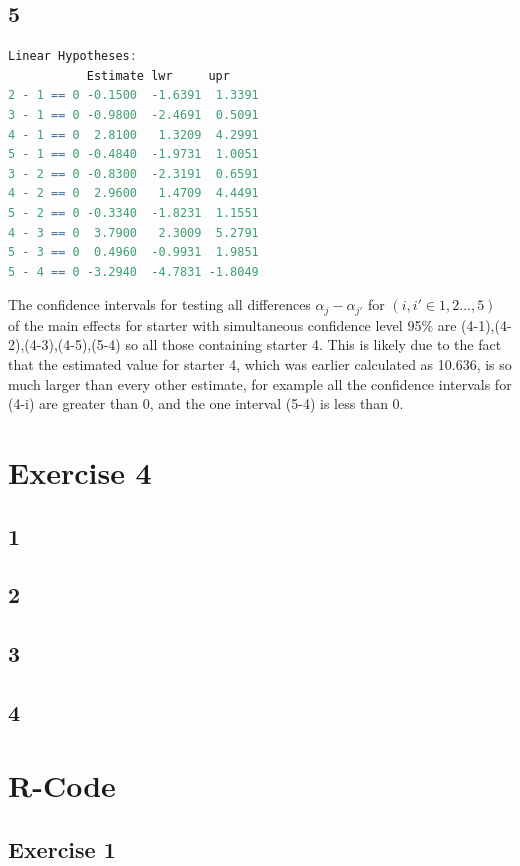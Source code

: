 \documentclass{article}
\begin{document}
    \subsection*{5}
      \begin{lstlisting}[language=R]
Linear Hypotheses:
           Estimate lwr     upr    
2 - 1 == 0 -0.1500  -1.6391  1.3391
3 - 1 == 0 -0.9800  -2.4691  0.5091
4 - 1 == 0  2.8100   1.3209  4.2991
5 - 1 == 0 -0.4840  -1.9731  1.0051
3 - 2 == 0 -0.8300  -2.3191  0.6591
4 - 2 == 0  2.9600   1.4709  4.4491
5 - 2 == 0 -0.3340  -1.8231  1.1551
4 - 3 == 0  3.7900   2.3009  5.2791
5 - 3 == 0  0.4960  -0.9931  1.9851
5 - 4 == 0 -3.2940  -4.7831 -1.8049
      \end{lstlisting}
    The confidence intervals for testing all differences $\alpha_j - \alpha_{j'}$ for $(i,i' \in {1,2...,5})$ of the main effects for starter with simultaneous confidence level 95\% are (4-1),(4-2),(4-3),(4-5),(5-4) so all those containing starter 4. This is likely due to the fact that the estimated value for starter 4, which was earlier calculated as 10.636, is so much larger than every other estimate, for example all the confidence intervals for (4-i) are greater than 0, and the one interval (5-4) is less than 0.
  \section*{Exercise 4}
    \subsection*{1}
    
    \subsection*{2}
    
    \subsection*{3}
    
    \subsection*{4}

    
  \section{R-Code}
    \subsection{Exercise 1}\label{sec:RE1}
      \begin{lstlisting}[language=R]
      \end{lstlisting}
\end{document}
